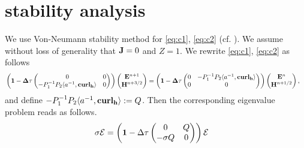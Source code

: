 \documentclass[12pt,reqno]{amsart}
\newcommand{\acurl}{\langle a^{-1},{\bf curl_h}\rangle}
\newcommand{\e}{{\bf E}}
\newcommand{\h}{{\bf H}}
\newcommand{\J}{{\bf J}}
\theoremstyle{definition}
\numberwithin{equation}{section}
\begin{document}
\section{stability analysis}
We use Von-Neumann stability method for \eqref{eq:c1}, \eqref{eq:c2} (cf. \cite{yefet_turkel}).
We assume without loss of generality  that $\J=0$ and $Z=1$.
	We rewrite  \eqref{eq:c1}, \eqref{eq:c2} as follows
\begin{align}\label{eq:stab1}
	&
	\left (\bf{1}-
		\Delta \tau
	\begin{pmatrix}
		 0&0\\
	 -P_1^{-1}P_2\acurl& 0
	\end{pmatrix}
\right)
				\begin{pmatrix}
		\e^{n+1} \\
		\h^{n+3/2}
	\end{pmatrix}=
\left (\bf{1}-\Delta \tau
\begin{pmatrix}
	0 &-P_1^{-1}P_2\acurl\\
	0& 0
\end{pmatrix}
\right)
				\begin{pmatrix}
	\e^{n} \\
	\h^{n+1/2}
\end{pmatrix},
\end{align}
and define $-P_1^{-1}P_2\acurl:=Q$.
Then the corresponding eigenvalue problem reads as follows.
\begin{align*}
	&
	\sigma
\mathcal{E}=
\left(
{\bf 1}-\Delta \tau
\begin{pmatrix}
	0& Q\\
-\sigma	 Q&0
\end{pmatrix}
\right)
\mathcal{E}
\end{align*}
\end{document}
